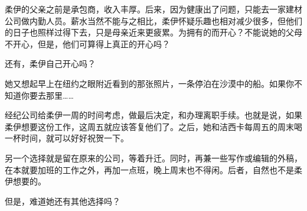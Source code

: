 柔伊的父亲之前是承包商，收入丰厚。后来，因为健康出了问题，只能去一家建材公司做内勤人员。薪水当然不能与之相比，柔伊怀疑乐趣也相对减少很多，但他们的日子也照样过得下去，只是母亲近来更疲累。为拥有的而开心？不能说她的父母不开心，但是，他们可算得上真正的开心吗？

还有，柔伊自己开心吗？

她又想起早上在纽约之眼附近看到的那张照片，一条停泊在沙漠中的船。如果你不知道你要去那里……

经纪公司给柔伊一周的时间考虑，做最后决定，和办理离职手续。也就是说，如果柔伊想要这份工作，这周五就应该答复他们了。之后，她和洁西卡每周五的周末喝一杯时间，就可以好好祝贺一下。

另一个选择就是留在原来的公司，等着升迁。同时，再兼一些写作或编辑的外稿，在本就要加班的工作之外，再加一点班，晚上周末也不得闲。后者，自然也不是柔伊想要的。

但是，难道她还有其他选择吗？
